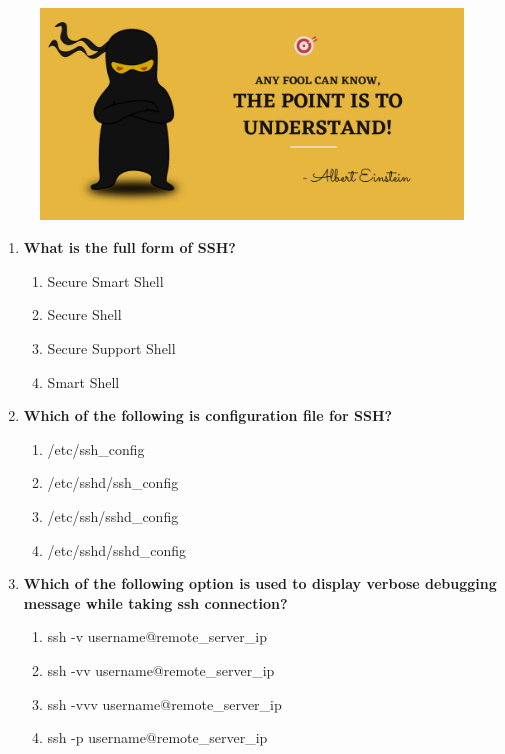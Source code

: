 \setlength{\columnsep}{3pt}
\begin{flushleft}
	
	\paragraph{}
	\bigskip
	
	\begin{figure}[h!]
		\centering
		\includegraphics[scale=.2]{content/practise.jpg}
	\end{figure}	
	\begin{enumerate}
		
		\item \textbf{What is the full form of SSH?}
		\begin{enumerate}[label=(\alph*)]
			\item Secure Smart Shell
			\item Secure Shell     %
			\item Secure Support Shell
			\item Smart Shell
		\end{enumerate}
		\bigskip
		\bigskip	

		\item \textbf{Which of the following is configuration file for SSH?}
		\begin{enumerate}[label=(\alph*)]
			\item /etc/ssh\_config
			\item /etc/sshd/ssh\_config
			\item /etc/ssh/sshd\_config %
			\item /etc/sshd/sshd\_config
		\end{enumerate}
		\bigskip
		\bigskip	
		
		\item \textbf{Which of the following option is used to display verbose debugging message while taking ssh connection?}	
		\begin{enumerate}[label=(\alph*)]
			\item ssh -v username@remote\_server\_ip   %
			\item ssh -vv username@remote\_server\_ip  %
			\item ssh -vvv username@remote\_server\_ip %
			\item ssh -p username@remote\_server\_ip
		\end{enumerate}
		\bigskip
		\bigskip	
		

\end{enumerate}
\end{flushleft}
